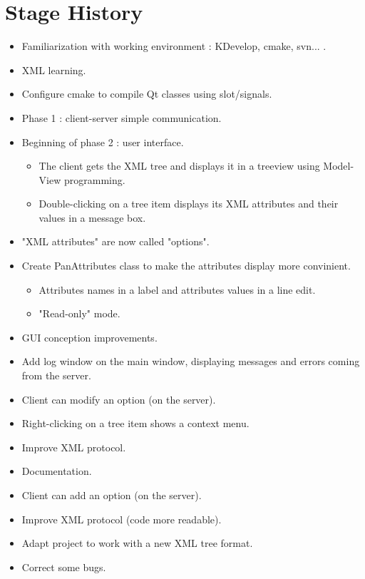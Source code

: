 \chapter{Stage History}

\begin{itemize}
 \item Familiarization with working environment : KDevelop, cmake, svn... .
 \item XML learning.
 \item Configure cmake to compile Qt classes using slot/signals.
 \item Phase 1 : client-server simple communication.
 \item Beginning of phase 2 : user interface.
 \begin{itemize}
  \item The client gets the XML tree and displays it in a treeview using
Model-View programming.
  \item Double-clicking on a tree item displays its XML attributes and their
values in a message box.
 \end{itemize}
\end{itemize}

\begin{itemize}
 \item "XML attributes" are now called "options".
 \item Create PanAttributes class to make the attributes display more
convinient.
 \begin{itemize}
  \item Attributes names in a label and attributes values in a line edit.
  \item "Read-only" mode.
 \end{itemize}
 \item GUI conception improvements.
 \item Add log window on the main window, displaying messages and errors coming
from the server.
 \item Client can modify an option (on the server).
 \item Right-clicking on a tree item shows a context menu.
 \item Improve XML protocol.
 \item Documentation.
\end{itemize}

\begin{itemize}
 \item Client can add an option (on the server).
 \item Improve XML protocol (code more readable).
 \item Adapt project to work with a new XML tree format.
 \item Correct some bugs. 
\end{itemize}

